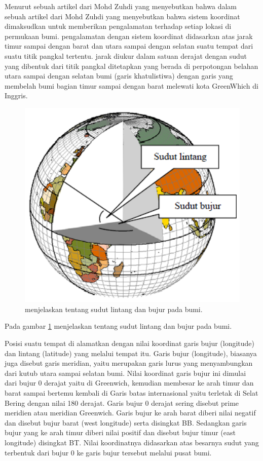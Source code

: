 	Menurut sebuah artikel dari Mohd Zuhdi yang menyebutkan bahwa dalam sebuah artikel dari Mohd Zuhdi yang menyebutkan bahwa sistem koordinat dimaksudkan 
untuk memberikan pengalamatan terhadap setiap lokasi di permukaan bumi. pengalamatan dengan sistem koordinat didasarkan atas jarak timur sampai dengan barat 
dan utara sampai dengan selatan suatu tempat dari suatu titik pangkal tertentu. jarak diukur dalam satuan derajat dengan sudut yang dibentuk dari titik 
pangkal ditetapkan yang berada di perpotongan belahan utara sampai dengan selatan bumi (garis khatulistiwa) dengan garis yang membelah bumi bagian timur sampai 
dengan barat melewati kota GreenWhich di Inggris.

	
\begin{figure}[ht]
\centerline{\includegraphics[width=1\textwidth]{figures/garis_lintang_dan_bujur.PNG}}
\caption{menjelaskan tentang sudut lintang dan bujur pada bumi.}
\label{garis_lintang_dan_bujur}
\end{figure}

Pada gambar \ref{garis_lintang_dan_bujur} menjelaskan tentang sudut lintang dan bujur pada bumi.

	Posisi suatu tempat di alamatkan dengan nilai koordinat garis bujur (longitude) dan lintang (latitude) yang melalui tempat itu. Garis bujur (longitude), 
biasanya juga disebut garis meridian, yaitu merupakan garis lurus yang menyambungkan dari kutub utara sampai selatan bumi. Nilai koordinat garis bujur ini dimulai dari
bujur 0 derajat yaitu di Greenwich, kemudian membesar ke arah timur dan barat sampai bertemu kembali di Garis batas internasional yaitu terletak 
di Selat Bering dengan nilai 180 derajat. Garis bujur 0 derajat sering disebut prime meridien atau meridian Greenwich. Garis bujur ke arah barat diberi 
nilai negatif dan disebut bujur barat (west longitude) serta disingkat BB. Sedangkan garis bujur yang ke arah timur diberi nilai positif 
dan disebut bujur timur (east longitude) disingkat BT. Nilai koordinatnya didasarkan atas besarnya sudut yang terbentuk dari bujur 0 ke garis bujur tersebut
 melalui pusat bumi.

